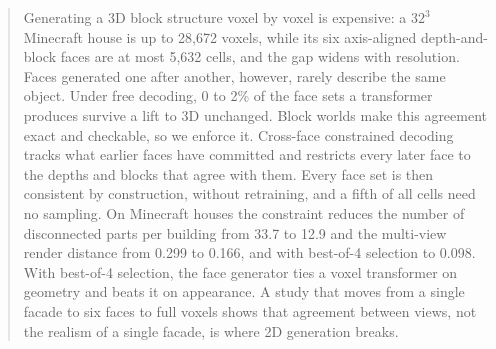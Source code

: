 \begin{abstract}
Generating a 3D block structure voxel by voxel is expensive: a $32^3$ Minecraft house is up to
28{,}672 voxels, while its six axis-aligned depth-and-block faces are at most 5{,}632 cells, and the
gap widens with resolution. Faces generated one after another, however, rarely describe the same
object. Under free decoding, 0 to 2\% of the face sets a transformer produces survive a lift to 3D
unchanged. Block worlds make this agreement exact and checkable, so we enforce it. Cross-face
constrained decoding tracks what earlier faces have committed and restricts every later face to the
depths and blocks that agree with them. Every face set is then consistent by construction, without
retraining, and a fifth of all cells need no sampling. On Minecraft houses the constraint reduces
the number of disconnected parts per building from 33.7 to 12.9 and the multi-view render distance
from 0.299 to 0.166, and with best-of-4 selection to 0.098. With best-of-4 selection, the face generator
ties a voxel transformer on geometry and beats it on appearance.
 A study that moves from a single facade
to six faces to full voxels shows that agreement between views, not the realism of a single facade,
is where 2D generation breaks. 
\end{abstract}
